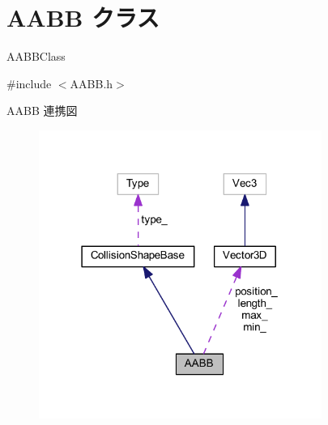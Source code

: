 \hypertarget{class_a_a_b_b}{}\section{A\+A\+BB クラス}
\label{class_a_a_b_b}


A\+A\+B\+B\+Class  




{\ttfamily \#include $<$A\+A\+B\+B.\+h$>$}



A\+A\+BB 連携図\nopagebreak
\begin{figure}[H]
\begin{center}
\leavevmode
\includegraphics[width=262pt]{class_a_a_b_b__coll__graph}
\end{center}
\end{figure}
